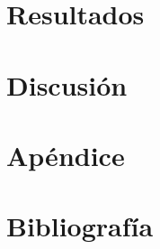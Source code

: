 \documentclass[
  english,
]{article}
\begin{document}
\hypertarget{resultados}{%
\section{Resultados}\label{resultados}}

\hypertarget{discusiuxf3n}{%
\section{Discusión}\label{discusiuxf3n}}

\hypertarget{apuxe9ndice}{%
\section{Apéndice}\label{apuxe9ndice}}

\hypertarget{bibliografuxeda}{%
\section{Bibliografía}\label{bibliografuxeda}}
\end{document}
